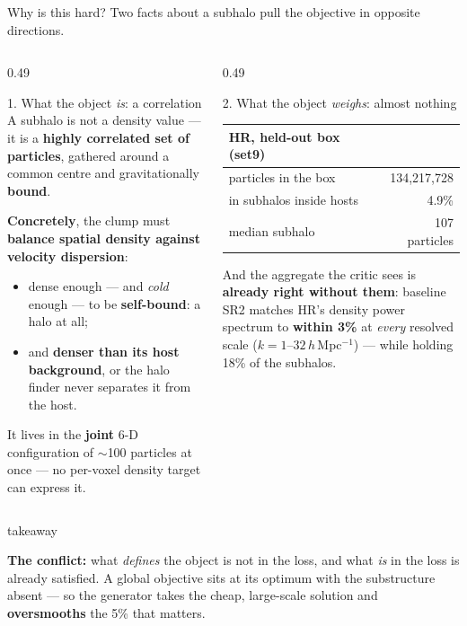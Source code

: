 \documentclass[aspectratio=169]{beamer}
\newcommand{\take}[1]{%
  \vspace{0.15cm}%
  \begin{beamercolorbox}[wd=\textwidth,sep=5pt,rounded=true]{takeaway}%
    \raggedright\footnotesize#1%
  \end{beamercolorbox}%
}
\begin{document}
\begin{frame}{Why is this hard?}
\small
Two facts about a subhalo pull the objective in opposite directions.

\vspace{0.1cm}
\begin{columns}[T]
\begin{column}{0.49\textwidth}
\begin{block}{1. What the object \emph{is}: a correlation}
A subhalo is not a density value --- it is a \textbf{highly correlated set of particles},
gathered around a common centre and gravitationally \textbf{bound}.

\vspace{0.12cm}
\textcolor{accent2}{\textbf{Concretely}}, the clump must \textbf{balance spatial density
against velocity dispersion}:
\begin{itemize}
  \item dense enough --- and \emph{cold} enough --- to be \textbf{self-bound}: a halo at all;
  \item and \textbf{denser than its host background}, or the halo finder never separates it
        from the host.
\end{itemize}

\vspace{0.1cm}
It lives in the \textbf{joint} 6-D configuration of $\sim$100 particles at once ---
no per-voxel density target can express it.
\end{block}
\end{column}

\begin{column}{0.49\textwidth}
\begin{block}{2. What the object \emph{weighs}: almost nothing}
\centering
\begin{tabular}{lr}
\toprule
HR, held-out box (set9) & \\
\midrule
particles in the box & 134{,}217{,}728 \\
in subhalos inside hosts & \alert{4.9\%} \\
median subhalo & \alert{107 particles} \\
\bottomrule
\end{tabular}

\vspace{0.15cm}
\raggedright
And the aggregate the critic sees is \textbf{already right without them}: baseline SR2
matches HR's density power spectrum to \textbf{within 3\%} at \emph{every} resolved scale
($k=1$--$32\,h\,$Mpc$^{-1}$) --- while holding \alert{18\%} of the subhalos.
\end{block}
\end{column}
\end{columns}

\take{\textbf{The conflict:} what \emph{defines} the object is not in the loss, and what
\emph{is} in the loss is already satisfied. A global objective sits at its optimum with the
substructure absent --- so the generator takes the cheap, large-scale solution and
\textbf{oversmooths} the 5\% that matters.}
\end{frame}
\end{document}
